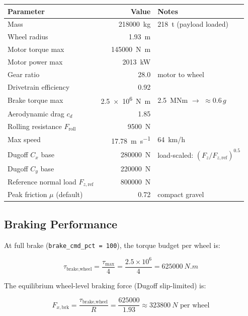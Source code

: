 \documentclass[11pt,a4paper]{article}
\begin{document}
\begin{center}
\begin{tabular}{lrl}
\toprule
Parameter & Value & Notes \\
\midrule
Mass & \SI{218000}{kg} & 218~t (payload loaded) \\
Wheel radius & \SI{1.93}{m} & \\
Motor torque max & \SI{145000}{N.m} & \\
Motor power max & \SI{2013}{kW} & \\
Gear ratio & 28.0 & motor to wheel \\
Drivetrain efficiency & 0.92 & \\
Brake torque max & \SI{2.5e6}{N.m} & 2.5~MNm $\to$ $\approx 0.6\,g$ \\
Aerodynamic drag $c_d$ & 1.85 & \\
Rolling resistance $F_\text{roll}$ & \SI{9500}{N} & \\
Max speed & \SI{17.78}{m.s^{-1}} & 64~km/h \\
Dugoff $C_x$ base & \SI{280000}{N} & load-scaled: $(F_z/F_{z,\text{ref}})^{0.5}$ \\
Dugoff $C_y$ base & \SI{220000}{N} & \\
Reference normal load $F_{z,\text{ref}}$ & \SI{800000}{N} & \\
Peak friction $\mu$ (default) & 0.72 & compact gravel \\
\bottomrule
\end{tabular}
\end{center}

\subsection{Braking Performance}

At full brake (\texttt{brake\_cmd\_pct = 100}), the torque budget per wheel is:

\begin{equation}
  \tau_{\text{brake,wheel}} = \frac{\tau_{\text{max}}}{4} = \frac{2.5 \times 10^6}{4} = \SI{625000}{N.m}
\end{equation}

The equilibrium wheel-level braking force (Dugoff slip-limited) is:

\begin{equation}
  F_{x,\text{brk}} = \frac{\tau_{\text{brake,wheel}}}{R} = \frac{625000}{1.93} \approx \SI{323800}{N} \text{ per wheel}
\end{equation}
\end{document}
